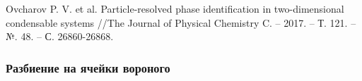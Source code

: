 \documentclass[pdf,hyperref={unicode}]{beamer}
\begin{document}
\begin{frame}
\begin{columns}
\end{columns}

\vspace{17mm}
\tiny{
Ovcharov P. V. et al. Particle-resolved phase identification in two-dimensional condensable systems //The Journal of Physical Chemistry C. – 2017. – Т. 121. – №. 48. – С. 26860-26868.
}

\end{frame}



\begin{frame}%
\transdissolve[duration=0.2]
\frametitle{Разбиение на ячейки вороного}

\begin{columns}


\begin{column}{0.47\linewidth}
\end{column}



\end{columns}
\end{frame}
\end{document}
